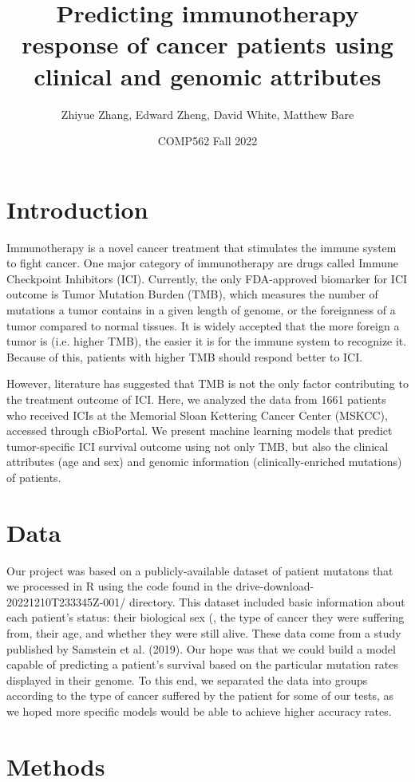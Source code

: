 \documentclass{article}
\title{Predicting immunotherapy response of cancer patients using clinical and genomic attributes}
\author{Zhiyue Zhang, Edward Zheng, David White, Matthew Bare}
\date{COMP562 Fall 2022}
\begin{document}
\maketitle

\section{Introduction}
Immunotherapy is a novel cancer treatment that stimulates the immune system to fight cancer. One major category of immunotherapy are drugs called Immune Checkpoint Inhibitors (ICI). Currently, the only FDA-approved biomarker for ICI outcome is Tumor Mutation Burden (TMB), which measures the number of mutations a tumor contains in a given length of genome, or the foreignness of a tumor compared to normal tissues. It is widely accepted that the more foreign a tumor is (i.e. higher TMB), the easier it is for the immune system to recognize it. Because of this, patients with higher TMB should respond better to ICI.

However, literature has suggested that TMB is not the only factor contributing to the treatment outcome of ICI. Here, we analyzed the data from 1661 patients who received ICIs at the Memorial Sloan Kettering Cancer Center (MSKCC), accessed through cBioPortal. We present machine learning models that predict tumor-specific ICI survival outcome using not only TMB, but also the clinical attributes (age and sex) and genomic information (clinically-enriched mutations) of patients.
\section{Data}
Our project was based on a publicly-available dataset of patient mutatons that we processed in R using the code found in the drive-download-20221210T233345Z-001/ directory. This dataset included basic information about each patient's status: their biological sex (, the type of cancer they were suffering from, their age, and whether they were still alive. These data come from a study published by Samstein et al. (2019). Our hope was that we could build a model capable of predicting a patient's survival based on the particular mutation rates displayed in their genome. To this end, we separated the data into groups according to the type of cancer suffered by the patient for some of our tests, as we hoped more specific models would be able to achieve higher accuracy rates.
\section{Methods}
\end{document}
